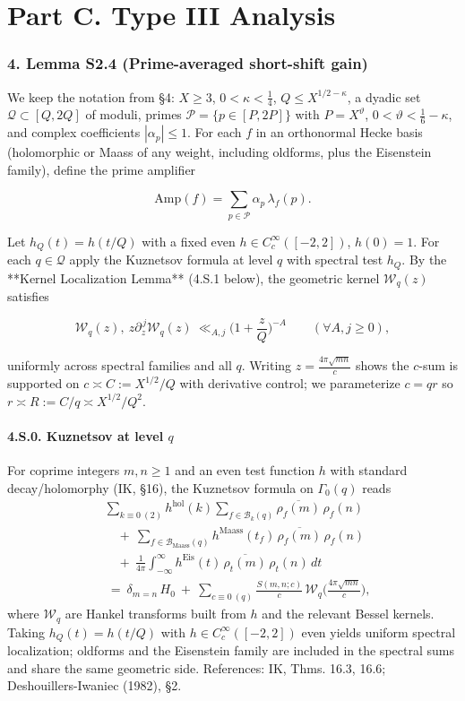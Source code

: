 \documentclass[11pt]{article}
\theoremstyle{definition}
\theoremstyle{remark}
\begin{document}
\part*{Part C. Type III Analysis}

\section*{4. Lemma S2.4 (Prime-averaged short-shift gain)}
We keep the notation from §4: $X\ge 3$, $0<\kappa<\tfrac14$, $Q\le X^{1/2-\kappa}$, a dyadic set $\mathcal Q\subset[Q,2Q]$ of moduli, primes $\mathcal P=\{p\in[P,2P]\}$ with $P=X^\vartheta$, $0<\vartheta<\tfrac16-\kappa$, and complex coefficients $|\alpha_p|\le 1$. For each $f$ in an orthonormal Hecke basis (holomorphic or Maass of any weight, including oldforms, plus the Eisenstein family), define the prime amplifier

$$
	\mathrm{Amp}(f)=\sum_{p\in\mathcal P}\alpha_p\,\lambda_f(p).
$$

Let $h_Q(t)=h(t/Q)$ with a fixed even $h\in C_c^\infty([-2,2])$, $h(0)=1$. For each $q\in\mathcal Q$ apply the Kuznetsov formula at level $q$ with spectral test $h_Q$. By the **Kernel Localization Lemma** (4.S.1 below), the geometric kernel $\mathcal W_q(z)$ satisfies

$$
	\mathcal W_q(z),\ z\partial_z^{\,j}\mathcal W_q(z)\ \ll_{A,j}\Big(1+\frac zQ\Big)^{-A}\qquad(\forall A,j\ge0),
$$

uniformly across spectral families and all $q$. Writing $z=\frac{4\pi\sqrt{mn}}{c}$ shows the $c$-sum is supported on $c\asymp C:=X^{1/2}/Q$ with derivative control; we parameterize $c=qr$ so $r\asymp R:=C/q\asymp X^{1/2}/Q^2$.

\subsection*{4.S.0. Kuznetsov at level $q$}
For coprime integers $m,n\ge 1$ and an even test function $h$ with standard decay/holomorphy (IK, §16), the Kuznetsov formula on $\Gamma_0(q)$ reads
\begin{align*}
	 & \sum_{k\equiv 0\ (2)} h^{\mathrm{hol}}(k)\!\sum_{f\in\mathcal B_k(q)} \overline{\rho_f(m)}\,\rho_f(n)                 \\
	 & \quad+\ \sum_{f\in\mathcal B_{\mathrm{Maass}}(q)} h^{\mathrm{Maass}}(t_f)\,\overline{\rho_f(m)}\,\rho_f(n)            \\
	 & \quad+\ \frac{1}{4\pi}\int_{-\infty}^{\infty} h^{\mathrm{Eis}}(t)\,\overline{\rho_t(m)}\,\rho_t(n)\,dt                \\
	 & \ =\ \delta_{m=n}\,H_0\ +\ \sum_{c\equiv 0\ (q)} \frac{S(m,n;c)}{c}\,\mathcal W_q\!\Big(\frac{4\pi\sqrt{mn}}{c}\Big),
\end{align*}
where $\mathcal W_q$ are Hankel transforms built from $h$ and the relevant Bessel kernels. Taking $h_Q(t)=h(t/Q)$ with $h\in C_c^\infty([-2,2])$ even yields uniform spectral localization; oldforms and the Eisenstein family are included in the spectral sums and share the same geometric side. References: IK, Thms. 16.3, 16.6; Deshouillers-Iwaniec (1982), §2.
\end{document}
